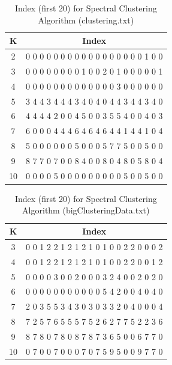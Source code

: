 \begin{description}
\begin{description}
\begin{table}[H]
	\centering
	\caption{Index (first 20) for Spectral Clustering Algorithm (clustering.txt)}
	\label{table:index_spectral_clustering}	
	\begin{tabular}{ c | c }
		\hline \hline
		K        &    Index  \\[0.1cm]
		\hline
		2     &  0 0 0 0 0 0 0 0 0 0 0 0 0 0 0 0 0 1 0 0 \\[0.1cm]
		3     &  0 0 0 0 0 0 0 0 1 0 0 2 0 1 0 0 0 0 0 1 \\[0.1cm]
		4     &  0 0 0 0 0 0 0 0 0 0 0 0 0 3 0 0 0 0 0 0 \\[0.1cm]
		5     &  3 4 4 3 4 4 4 3 4 0 4 0 4 4 3 4 4 3 4 0 \\[0.1cm]
		6     &  4 4 4 4 2 0 0 4 5 0 0 3 5 5 4 0 0 4 0 3 \\[0.1cm]
		7     &  6 0 0 0 4 4 4 6 4 6 4 6 4 4 1 4 4 1 0 4 \\[0.1cm]
		8     &  5 0 0 0 0 0 0 5 0 0 0 5 7 7 5 0 0 5 0 0 \\[0.1cm]
		9     &  8 7 7 0 7 0 0 8 4 0 0 8 0 4 8 0 5 8 0 4 \\[0.1cm]
		10   &  0 0 0 0 5 0 0 0 0 0 0 0 0 0 5 0 0 5 0 0 \\[0.1cm]
		\hline	
	\end{tabular}
\end{table}

\begin{table}[H]
	\centering
	\caption{Index (first 20) for Spectral Clustering Algorithm (bigClusteringData.txt)}
	\label{table:index_spectral_bigClustering}	
	\begin{tabular}{ c | c }
		\hline \hline
		K    & Index \\[0.1cm]
		\hline
		3     &  0 0 1 2 2 1 2 1 2 1 0 1 0 0 2 2 0 0 0 2 \\[0.1cm]
		4     &  0 0 1 2 2 1 2 1 2 1 0 1 0 0 2 2 0 0 1 2 \\[0.1cm]
		5     &  0 0 0 0 3 0 0 2 0 0 0 3 2 4 0 0 2 0 2 0 \\[0.1cm]
		6     &  0 0 0 0 0 0 0 0 0 0 0 5 4 2 0 0 4 0 4 0 \\[0.1cm]
		7     &  2 0 3 5 5 3 4 3 0 3 0 3 3 2 0 4 0 0 0 4 \\[0.1cm]
		8     &  7 2 5 7 6 5 5 5 7 5 2 6 2 7 7 5 2 2 3 6 \\[0.1cm]
		9     &  8 7 8 0 7 8 0 8 7 8 7 3 6 5 0 0 6 7 7 0 \\[0.1cm]
		10   &  0 7 0 0 7 0 0 0 7 0 7 5 9 5 0 0 9 7 7 0 \\[0.1cm]
		\hline	
	\end{tabular}
\end{table}


\end{description}
\end{description}
